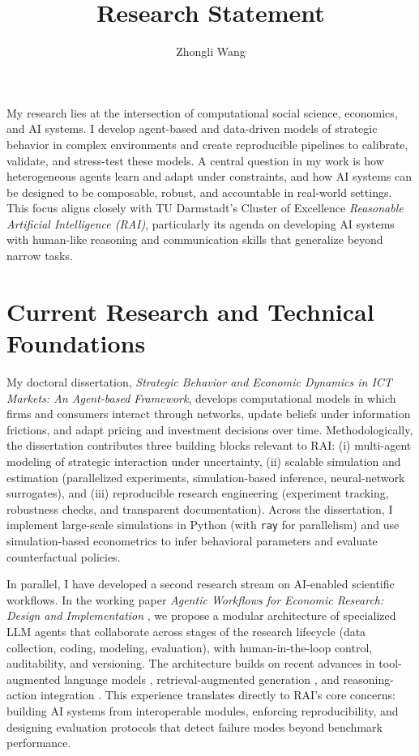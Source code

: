 \documentclass{nfr}
\title{Research Statement}
\author{Zhongli Wang}
\begin{document}
\maketitle

My research lies at the intersection of computational social science, economics, and AI systems. I develop agent-based and data-driven models of strategic behavior in complex environments and create reproducible pipelines to calibrate, validate, and stress-test these models. A central question in my work is how heterogeneous agents learn and adapt under constraints, and how AI systems can be designed to be composable, robust, and accountable in real-world settings. This focus aligns closely with TU Darmstadt's Cluster of Excellence \emph{Reasonable Artificial Intelligence (RAI)}, particularly its agenda on developing AI systems with human-like reasoning and communication skills that generalize beyond narrow tasks.

\section*{Current Research and Technical Foundations}

My doctoral dissertation, \textit{Strategic Behavior and Economic Dynamics in ICT Markets: An Agent-based Framework}, develops computational models in which firms and consumers interact through networks, update beliefs under information frictions, and adapt pricing and investment decisions over time. Methodologically, the dissertation contributes three building blocks relevant to RAI:
(i) multi-agent modeling of strategic interaction under uncertainty,
(ii) scalable simulation and estimation (parallelized experiments, simulation-based inference, neural-network surrogates), and
(iii) reproducible research engineering (experiment tracking, robustness checks, and transparent documentation).
Across the dissertation, I implement large-scale simulations in Python (with \texttt{ray} for parallelism) and use simulation-based econometrics to infer behavioral parameters and evaluate counterfactual policies.

In parallel, I have developed a second research stream on AI-enabled scientific workflows. In the working paper \textit{Agentic Workflows for Economic Research: Design and Implementation} \citep{Dawid2025}, we propose a modular architecture of specialized LLM agents that collaborate across stages of the research lifecycle (data collection, coding, modeling, evaluation), with human-in-the-loop control, auditability, and versioning. The architecture builds on recent advances in tool-augmented language models \citep{schick2023toolformer}, retrieval-augmented generation \citep{lewis2020retrieval}, and reasoning-action integration \citep{yao2022react, wei2022chain}. This experience translates directly to RAI's core concerns: building AI systems from interoperable modules, enforcing reproducibility, and designing evaluation protocols that detect failure modes beyond benchmark performance.
\end{document}
